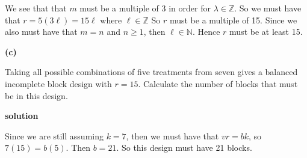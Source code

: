 \documentclass[12pt,]{article}
\begin{document}
We see that that \(m\) must be a multiple of 3 in order for
\(\lambda \in \mathbb{Z}\). So we must have that
\(r= 5 (3\ell) = 15 \ell\) where \(\ell \in \mathbb{Z}\) So \(r\) must
be a multiple of 15. Since we also must have that \(m=n\) and
\(n \geq 1\), then \(\ell \in \mathbb{N}\). Hence \(r\) must be at least
15.

\textbf{(c)}

Taking all possible combinations of five treatments from seven gives a
balanced incomplete block design with \(r = 15\). Calculate the number
of blocks that must be in this design.

\textbf{solution}

Since we are still assuming \(k=7\), then we must have that \(vr = bk\),
so \(7(15) = b (5)\). Then \(b=21\). So this design must have 21 blocks.
\end{document}
